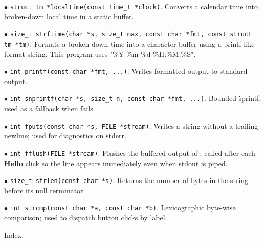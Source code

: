 \item{$\bullet$} {\tt struct tm *localtime(const time\_t *clock)}.
Converts a calendar time into broken-down local time in a static
buffer.

\item{$\bullet$} {\tt size\_t strftime(char *s, size\_t max,
const char *fmt, const struct tm *tm)}.
Formats a broken-down time into a character buffer using a
\.{printf}-like format string.  This program uses
\.{"\%Y-\%m-\%d \%H:\%M:\%S"}.

\item{$\bullet$} {\tt int printf(const char *fmt, ...)}.
Writes formatted output to standard output.

\item{$\bullet$} {\tt int snprintf(char *s, size\_t n,
const char *fmt, ...)}.
Bounded \.{sprintf}; used as a fallback when  fails.

\item{$\bullet$} {\tt int fputs(const char *s, FILE *stream)}.
Writes a string without a trailing newline; used for diagnostics
on \.{stderr}.

\item{$\bullet$} {\tt int fflush(FILE *stream)}.
Flushes the buffered output of ; called after each
{\bf Hello} click so the line appears immediately even when
\.{stdout} is piped.

\item{$\bullet$} {\tt size\_t strlen(const char *s)}.
Returns the number of bytes in the string before its null
terminator.

\item{$\bullet$} {\tt int strcmp(const char *a, const char *b)}.
Lexicographic byte-wise comparison; used to dispatch button clicks
by label.

\fi

Index.
\fi

\inx
\fin
\con
